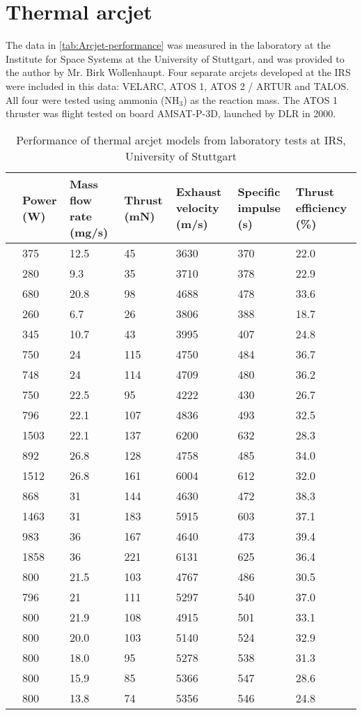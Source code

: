 \section{Thermal arcjet}\label{sec:Arcjet-characteristics}

The data in \autoref{tab:Arcjet-performance} was measured in the laboratory at the Institute for Space Systems at the University of Stuttgart, and was provided to the author by Mr. Birk Wollenhaupt. Four separate arcjets developed at the IRS were included in this data: VELARC, ATOS 1, ATOS 2 / ARTUR and TALOS. All four were tested using ammonia (NH$_3$) as the reaction mass. The ATOS 1 thruster was flight tested on board AMSAT-P-3D, launched by DLR in 2000.

\begin{table}[h]
\caption{Performance of thermal arcjet models from laboratory tests at IRS, University of Stuttgart}
\label{tab:Arcjet-performance}
\begin{center}
\begin{tabular}{c C{0.09\textwidth} C{0.12\textwidth} C{0.1\textwidth} C{0.12\textwidth} C{0.12\textwidth} C{0.13\textwidth} }\toprule
& Power (W) & Mass flow rate (mg/s) & Thrust (mN) & Exhaust velocity (m/s) & Specific impulse (s) & Thrust efficiency (\%) \tabularnewline\midrule
& 375 & 12.5 & 45 & 3630 & 370 & 22.0 \tabularnewline
& 280 & 9.3 & 35 & 3710 & 378 & 22.9 \tabularnewline
& 680 & 20.8 & 98 & 4688 & 478 & 33.6 \tabularnewline
& 260 & 6.7 & 26 & 3806 & 388 & 18.7 \tabularnewline
& 345 & 10.7 & 43 & 3995 & 407 & 24.8 \tabularnewline\midrule
& 750 & 24 & 115 & 4750 & 484 & 36.7 \tabularnewline
& 748 & 24 & 114 & 4709 & 480 & 36.2 \tabularnewline
& 750 & 22.5 & 95 & 4222 & 430 & 26.7 \tabularnewline\midrule
& 796 & 22.1 & 107 & 4836 & 493 & 32.5 \tabularnewline
& 1503 & 22.1 & 137 & 6200 & 632 & 28.3 \tabularnewline
& 892 & 26.8 & 128 & 4758 & 485 & 34.0 \tabularnewline
& 1512 & 26.8 & 161 & 6004 & 612 & 32.0 \tabularnewline
& 868 & 31 & 144 & 4630 & 472 & 38.3 \tabularnewline
& 1463 & 31 & 183 & 5915 & 603 & 37.1 \tabularnewline
& 983 & 36 & 167 & 4640 & 473 & 39.4 \tabularnewline
& 1858 & 36 & 221 & 6131 & 625 & 36.4 \tabularnewline\midrule
& 800 & 21.5 & 103 & 4767 & 486 & 30.5 \tabularnewline
& 796 & 21 & 111 & 5297 & 540 & 37.0 \tabularnewline
& 800 & 21.9 & 108 & 4915 & 501 & 33.1 \tabularnewline
& 800 & 20.0 & 103 & 5140 & 524 & 32.9 \tabularnewline
& 800 & 18.0 &  95 & 5278 & 538 & 31.3 \tabularnewline
& 800 & 15.9 & 85 & 5366 & 547 & 28.6 \tabularnewline
& 800 & 13.8 & 74 & 5356 & 546 & 24.8 \tabularnewline\bottomrule
\end{tabular}
\end{center}
\end{table}

